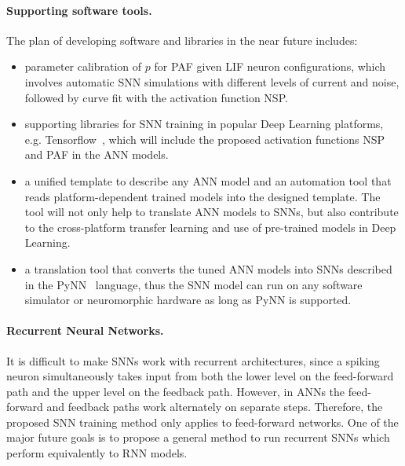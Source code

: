 \paragraph{Supporting software tools.}
The plan of developing software and libraries in the near future includes:

 \begin{itemize} 
	\item parameter calibration of $p$ for PAF given LIF neuron configurations, which involves automatic SNN simulations with different levels of current and noise, followed by curve fit with the activation function NSP. 

	\item supporting libraries for SNN training in popular Deep Learning platforms, e.g. Tensorflow~\citep{abadi2016tensorflow}, which will include the proposed activation functions NSP and PAF in the ANN models.

	\item a unified template to describe any ANN model and an automation tool that reads platform-dependent trained models into the designed template.
	The tool will not only help to translate ANN models to SNNs, but also contribute to the cross-platform transfer learning and use of pre-trained models in Deep Learning.

	\item a translation tool that converts the tuned ANN models into SNNs described in the PyNN~\citep{davison2008pynn} language, thus the SNN model can run on any software simulator or neuromorphic hardware as long as PyNN is supported.
 \end{itemize} 

\paragraph{Recurrent Neural Networks.}
It is difficult to make SNNs work with recurrent architectures, since a spiking neuron simultaneously takes input from both the lower level on the feed-forward path and the upper level on the feedback path.
However, in ANNs the feed-forward and feedback paths work alternately on separate steps.
Therefore, the proposed SNN training method only applies to feed-forward networks.
One of the major future goals is to propose a general method to run recurrent SNNs which perform equivalently to RNN models.

